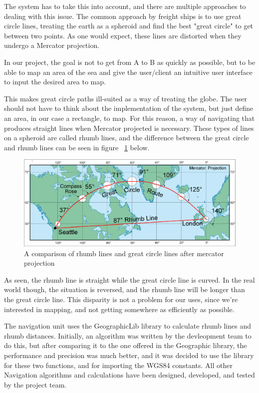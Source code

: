 The system has to take this into account, and there are multiple approaches to dealing with this issue. The common approach by freight ships is to use great circle lines, treating the earth as a spheroid and find the best "great circle" to get between two points. As one would expect, these lines are distorted when they undergo a Mercator projection. 

In our project, the goal is not to get from A to B as quickly as possible, but to be able to map an area of the sea and give the user/client an intuitive user interface to input the desired area to map. 

This makes great circle paths ill-suited as a way of treating the globe. The user should not have to think about the implementation of the system, but just define an area, in our case a rectangle, to map. For this reason, a way of navigating that produces straight lines when Mercator projected is necessary. These types of lines on a spheroid are called rhumb lines, and the difference between the great circle and rhumb lines can be seen in figure ~\ref{fig:rhumbgreatcirclemercator} below.

\begin{figure}[H]
\centering
\includegraphics[width=0.9\linewidth]{Images/Implementation/Rhumb_vs_great_circle_mercator_projection}
\caption{A comparison of rhumb lines and great circle lines after mercator projection \cite{rhumb-greate-cirle}}
\label{fig:rhumbgreatcirclemercator}
\end{figure}

As seen, the rhumb line is straight while the great circle line is curved. In the real world though, the situation is reversed, and the rhumb line will be longer than the great circle line. This disparity is not a problem for our uses, since we're interested in mapping, and not getting somewhere as efficiently as possible. 

The navigation unit uses the GeographicLib library to calculate rhumb lines and rhumb distances. Initially, an algorithm was written by the devleopment team to do this, but after comparing it to the one offered in the Geographic library, the performance and precision was much better, and it was decided to use the library for these two functions, and for importing the WGS84 constants. All other Navigation algorithms and calculations have been designed, developed, and tested by the project team.

